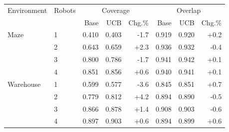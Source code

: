 \begin{tabular}{@{}llrrrrrr@{}}
\toprule
Environment & Robots & \multicolumn{3}{c}{Coverage} & \multicolumn{3}{c}{Overlap} \\
& & Base & UCB & Chg.\% & Base & UCB & Chg.\% \\
\midrule
Maze & 1 & 0.410 & 0.403 & -1.7 & 0.919 & 0.920 & +0.2 \\
 & 2 & 0.643 & 0.659 & +2.3 & 0.936 & 0.932 & -0.4 \\
 & 3 & 0.800 & 0.786 & -1.7 & 0.941 & 0.942 & +0.1 \\
 & 4 & 0.851 & 0.856 & +0.6 & 0.940 & 0.941 & +0.1 \\
Warehouse & 1 & 0.599 & 0.577 & -3.6 & 0.845 & 0.851 & +0.7 \\
 & 2 & 0.779 & 0.812 & +4.2 & 0.894 & 0.890 & -0.5 \\
 & 3 & 0.866 & 0.878 & +1.4 & 0.908 & 0.903 & -0.6 \\
 & 4 & 0.897 & 0.903 & +0.6 & 0.894 & 0.899 & +0.6 \\
\bottomrule
\end{tabular}
